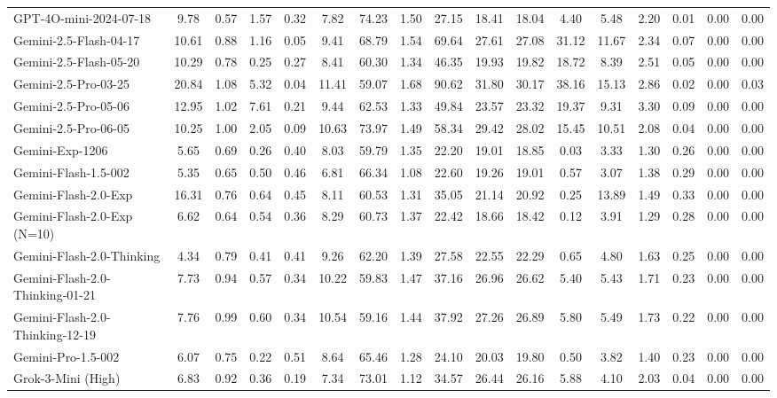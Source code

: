 \begin{table}[t]
{\begin{tabular}{|l|cccc|cc|cccccc|ccc|c|}
GPT-4O-mini-2024-07-18 & 9.78 & 0.57 & 1.57 & 0.32 & 7.82 & 74.23 & 1.50 & 27.15 & 18.41 & 18.04 & 4.40 & 5.48 & 2.20 & 0.01 & 0.00 & 0.00 \\
Gemini-2.5-Flash-04-17 & 10.61 & 0.88 & 1.16 & 0.05 & 9.41 & 68.79 & 1.54 & 69.64 & 27.61 & 27.08 & 31.12 & 11.67 & 2.34 & 0.07 & 0.00 & 0.00 \\
Gemini-2.5-Flash-05-20 & 10.29 & 0.78 & 0.25 & 0.27 & 8.41 & 60.30 & 1.34 & 46.35 & 19.93 & 19.82 & 18.72 & 8.39 & 2.51 & 0.05 & 0.00 & 0.00 \\
Gemini-2.5-Pro-03-25 & 20.84 & 1.08 & 5.32 & 0.04 & 11.41 & 59.07 & 1.68 & 90.62 & 31.80 & 30.17 & 38.16 & 15.13 & 2.86 & 0.02 & 0.00 & 0.03 \\
Gemini-2.5-Pro-05-06 & 12.95 & 1.02 & 7.61 & 0.21 & 9.44 & 62.53 & 1.33 & 49.84 & 23.57 & 23.32 & 19.37 & 9.31 & 3.30 & 0.09 & 0.00 & 0.00 \\
Gemini-2.5-Pro-06-05 & 10.25 & 1.00 & 2.05 & 0.09 & 10.63 & 73.97 & 1.49 & 58.34 & 29.42 & 28.02 & 15.45 & 10.51 & 2.08 & 0.04 & 0.00 & 0.00 \\
Gemini-Exp-1206 & 5.65 & 0.69 & 0.26 & 0.40 & 8.03 & 59.79 & 1.35 & 22.20 & 19.01 & 18.85 & 0.03 & 3.33 & 1.30 & 0.26 & 0.00 & 0.00 \\
Gemini-Flash-1.5-002 & 5.35 & 0.65 & 0.50 & 0.46 & 6.81 & 66.34 & 1.08 & 22.60 & 19.26 & 19.01 & 0.57 & 3.07 & 1.38 & 0.29 & 0.00 & 0.00 \\
Gemini-Flash-2.0-Exp & 16.31 & 0.76 & 0.64 & 0.45 & 8.11 & 60.53 & 1.31 & 35.05 & 21.14 & 20.92 & 0.25 & 13.89 & 1.49 & 0.33 & 0.00 & 0.00 \\
Gemini-Flash-2.0-Exp (N=10) & 6.62 & 0.64 & 0.54 & 0.36 & 8.29 & 60.73 & 1.37 & 22.42 & 18.66 & 18.42 & 0.12 & 3.91 & 1.29 & 0.28 & 0.00 & 0.00 \\
Gemini-Flash-2.0-Thinking & 4.34 & 0.79 & 0.41 & 0.41 & 9.26 & 62.20 & 1.39 & 27.58 & 22.55 & 22.29 & 0.65 & 4.80 & 1.63 & 0.25 & 0.00 & 0.00 \\
Gemini-Flash-2.0-Thinking-01-21 & 7.73 & 0.94 & 0.57 & 0.34 & 10.22 & 59.83 & 1.47 & 37.16 & 26.96 & 26.62 & 5.40 & 5.43 & 1.71 & 0.23 & 0.00 & 0.00 \\
Gemini-Flash-2.0-Thinking-12-19 & 7.76 & 0.99 & 0.60 & 0.34 & 10.54 & 59.16 & 1.44 & 37.92 & 27.26 & 26.89 & 5.80 & 5.49 & 1.73 & 0.22 & 0.00 & 0.00 \\
Gemini-Pro-1.5-002 & 6.07 & 0.75 & 0.22 & 0.51 & 8.64 & 65.46 & 1.28 & 24.10 & 20.03 & 19.80 & 0.50 & 3.82 & 1.40 & 0.23 & 0.00 & 0.00 \\
Grok-3-Mini (High) & 6.83 & 0.92 & 0.36 & 0.19 & 7.34 & 73.01 & 1.12 & 34.57 & 26.44 & 26.16 & 5.88 & 4.10 & 2.03 & 0.04 & 0.00 & 0.00 \\

\end{tabular}}
\end{table}
